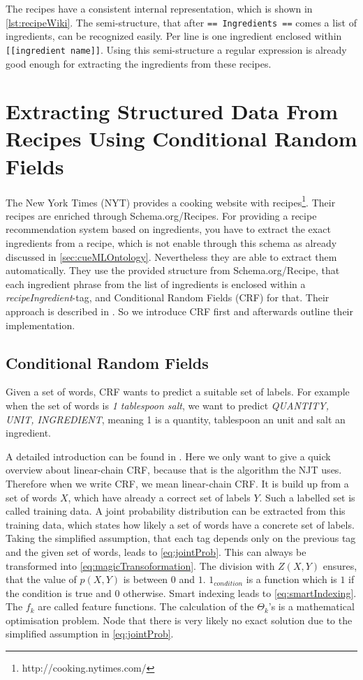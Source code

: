 \documentclass[12pt, twoside]{report}
\begin{document}
The recipes have a consistent internal representation, which is shown in \cref{lst:recipeWiki}. The semi-structure, that after \texttt{== Ingredients ==} comes a list of ingredients, can be recognized easily. Per line is one ingredient enclosed within \texttt{[[ingredient name]]}. Using this semi-structure a regular expression is already good enough for extracting the ingredients from these recipes.

\section{Extracting Structured Data From Recipes Using Conditional Random Fields}\label{sec:crfzeit}
The New York Times (NYT) provides a cooking website with recipes\footnote{http://cooking.nytimes.com/}. Their recipes are enriched through Schema.org/Recipes. For providing a recipe recommendation system based on ingredients, you have to extract the exact ingredients from a recipe, which is not enable through this schema as already discussed in \cref{sec:cueMLOntology}. Nevertheless they are able to extract them automatically. They use the provided structure from Schema.org/Recipe, that each ingredient phrase from the list of ingredients is enclosed within a \textit{recipeIngredient}-tag, and Conditional Random Fields (CRF) for that. Their approach is described in \parencite{CRFZeit}. So we introduce CRF first and afterwards outline their implementation.  

\subsection{Conditional Random Fields}
Given a set of words, CRF wants to predict a suitable set of labels. For example when the set of words is \textit{1 tablespoon salt}, we want to predict \textit{QUANTITY, UNIT, INGREDIENT}, meaning 1 is a quantity, tablespoon an unit and salt an ingredient.

A detailed introduction can be found in \parencite{CRFIntroduction}. Here we only want to give a quick overview about linear-chain CRF, because that is the algorithm the NJT uses. Therefore when we write CRF, we mean linear-chain CRF. It is build up from a set of words $X$, which have already a correct set of labels $Y$. Such a labelled set is called training data. A joint probability distribution can be extracted from this training data, which states how likely a set of words have a concrete set of labels. Taking the simplified assumption, that each tag depends only on the previous tag and the given set of words, leads to \cref{eq:jointProb}. This can always be transformed into \cref{eq:magicTransoformation}. The division with $Z(X,Y)$ ensures, that the value of $p(X,Y)$ is between $0$ and $1$. $1_{condition}$ is a function which is $1$ if the condition is true and $0$ otherwise. Smart indexing leads to \cref{eq:smartIndexing}. The $f_k$ are called feature functions. The calculation of the $\Theta_k$'s is a mathematical optimisation problem. Node that there is very likely no exact solution due to the simplified assumption in \cref{eq:jointProb}.
\end{document}

